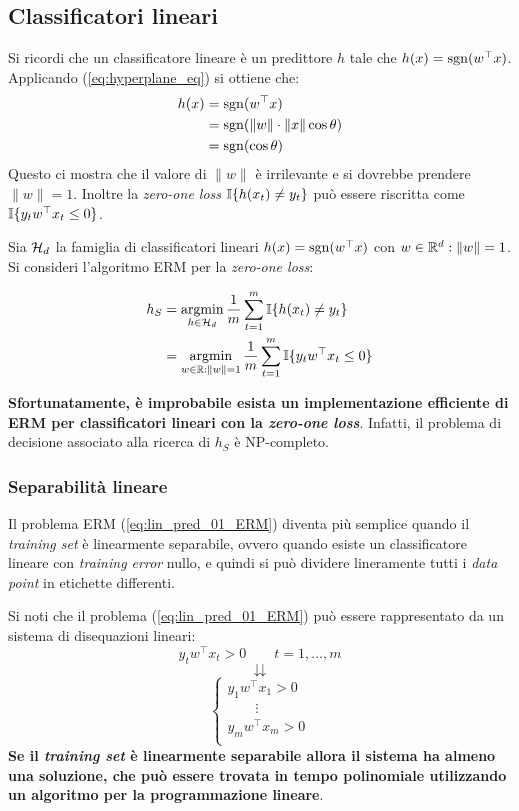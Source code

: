\subsection{Classificatori lineari}
Si ricordi che un classificatore lineare è un predittore $h$ tale che
$h(x)=\operatorname*{sgn}(w^\top x)$. Applicando (\ref{eq:hyperplane_eq}) si ottiene che:
$$ \begin{aligned}
   h(x)&=\operatorname*{sgn}(w^\top x)\\
   &=\operatorname*{sgn}(\|w\|\cdot\|x\|\cos\theta)\\
   &=\operatorname*{sgn}(\cos\theta)\\
\end{aligned} $$
Questo ci mostra che il valore di $\|w\|$ è irrilevante e si dovrebbe
prendere $\|w\|=1$. Inoltre la \textit{zero-one loss} $\mathbb{I}\{h(x_t)\neq y_t\}$
può essere riscritta come $\mathbb{I}\{y_tw^\top x_t\leq 0\}$.

Sia $\mathcal{H}_d$ la famiglia di classificatori lineari $h(x)=\operatorname*{sgn}(w^\top x)$
con $w \in \mathbb{R}^d:\|w\|=1$. Si consideri l'algoritmo ERM per la 
\textit{zero-one loss}:

\begin{align}
h_S &= \operatorname*{argmin}_{h\in\mathcal{H}_d}\frac{1}{m}\sum_{t=1}^{m}\mathbb{I}\{h(x_t)\neq y_t\}
   \notag\\
&= \operatorname*{argmin}_{w\in\mathbb{R}:\|w\|=1}\frac{1}{m}\sum_{t=1}^{m}\mathbb{I}\{y_tw^\top x_t\leq 0\}
\label{eq:lin_pred_01_ERM}
\end{align}

\textbf{Sfortunatamente, è improbabile esista un implementazione efficiente
di ERM per classificatori lineari con la \textit{zero-one loss}}. Infatti,
il problema di decisione associato alla ricerca di $h_S$ è NP-completo.

\subsubsection{Separabilità lineare}

Il problema ERM (\ref{eq:lin_pred_01_ERM}) diventa più semplice quando il 
\textit{training set} è linearmente separabile, ovvero quando esiste un 
classificatore lineare con \textit{training error} nullo, e quindi si può 
dividere lineramente tutti i \textit{data point} in etichette differenti.

Si noti che il problema (\ref{eq:lin_pred_01_ERM}) può essere rappresentato 
da un sistema di disequazioni lineari:
$$ y_tw^\top x_t >0 \qquad t=1,\dots,m $$
$$ \downdownarrows $$
$$ \begin{cases}
y_1 w^\top x_1 >0 \\
\qquad\vdots \\
y_m w^\top x_m >0 \\
\end{cases} $$
\textbf{Se il \textit{training set} è linearmente separabile allora il
sistema ha almeno una soluzione, che può essere trovata in tempo polinomiale
utilizzando un algoritmo per la programmazione lineare}.

